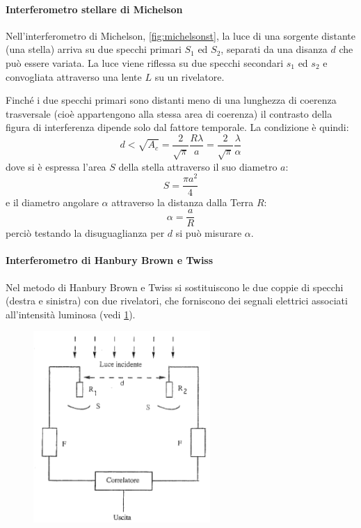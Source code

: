 \paragraph{Interferometro stellare di Michelson} Nell'interferometro di Michelson, \cref{fig:michelsonst}, la luce di una sorgente distante (una stella) arriva su due specchi primari $ S_1$ ed $ S_2 $, separati da una disanza $ d $ che può essere variata. La luce viene riflessa su due specchi secondari $ s_1$ ed $ s_2 $ e convogliata attraverso una lente $ L $ su  un rivelatore.

Finché i due specchi primari sono distanti meno di una lunghezza di coerenza trasversale (cioè appartengono alla stessa area di coerenza) il contrasto della figura di interferenza dipende solo dal fattore temporale. La condizione è quindi:
\[ d < \sqrt{A_c} = \frac{2}{\sqrt{\pi}}\frac{R \lambda}{a} = \frac{2}{\sqrt{\pi}}\frac{\lambda}{\alpha} \]
dove si è espressa l'area $ S $ della stella attraverso il suo diametro $ a $:
\[ S = \frac{\pi a^2}{4} \]
e il diametro angolare $ \alpha $ attraverso la distanza dalla Terra $ R $:
\[ \alpha = \frac{a}{R} \]
perciò testando la disuguaglianza per $ d $ si può misurare $ \alpha $.

\paragraph{Interferometro di Hanbury Brown e Twiss} Nel metodo di Hanbury Brown e Twiss si sostituiscono le due coppie di specchi (destra e sinistra) con due rivelatori, che forniscono dei segnali elettrici associati all'intensità luminosa (vedi \cref{fig:hbrowntwiss}).

\begin{figure}[t]
	\centering
	\includegraphics[width=0.6\textwidth]{Immagini/HanburyBrownTwiss.png}
	\vspace{-10pt}
	\caption{}
	\label{fig:hbrowntwiss}
	\vspace{-10pt}
\end{figure}

